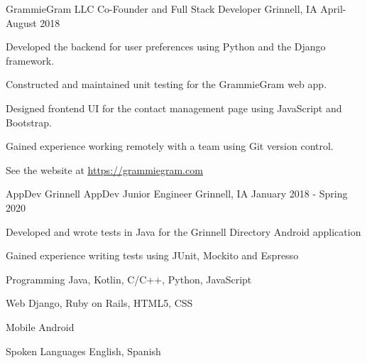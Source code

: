 \documentclass[12pt, a4paper]{awesome-cv}
\begin{document}
\begin{cventries}
  \cventry
    {GrammieGram LLC}
    {Co-Founder and Full Stack Developer}
    {Grinnell, IA}
    {April-August 2018}
    {
      \begin{cvitems}
        \item {Developed the backend for user preferences using Python and the Django framework.}
        \item {Constructed and maintained unit testing for the GrammieGram web app.}
        \item {Designed frontend UI for the contact management page using JavaScript and Bootstrap.}
        \item {Gained experience working remotely with a team using Git version control.}
	    \item {See the website at \underline{\href{https://grammiegram.com}{https://grammiegram.com}}}
      \end{cvitems}
    }


  \cventry
    {AppDev Grinnell}
    {AppDev Junior Engineer}
    {Grinnell, IA}
    {January 2018 - Spring 2020}
    {
      \begin{cvitems}
        \item {Developed and wrote tests in Java for the Grinnell Directory Android application}
	    \item {Gained experience writing tests using JUnit, Mockito and Espresso}
      \end{cvitems}
    }

\end{cventries}


\begin{cvskills}
  \cvskill
    {Programming} 
    {Java, Kotlin, C/C++, Python, JavaScript} 

  \cvskill
    {Web} 
    {Django, Ruby on Rails, HTML5, CSS} 

  \cvskill
    {Mobile}
    {Android}

  \cvskill
    {Spoken Languages} 
    {English, Spanish} 

\end{cvskills}
\end{document}
